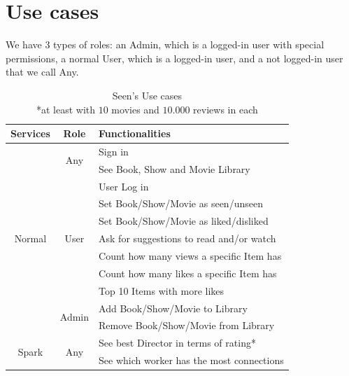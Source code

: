 \documentclass[oneside]{article}
\newcommand*\fpar{\hspace{1ex}}
\begin{document}
\section{Use cases}
\label{sec:cases}
\fpar We have 3 types of roles: an Admin, which is a logged-in user with special permissions, a normal User, which is a logged-in user, and a not logged-in user that we call Any.
\begin{table}[H]
  \centering
  \begin{tabular}{c|c|l} 
    Services & Role & Functionalities \\ \hline
    \multirow{11}{*}{ Normal }
      & \multirow{2}{*}{ Any } 
        & Sign in \\
      & & See Book, Show and Movie Library \\ \cline{2-3}
      & \multirow{7}{*}{ User } 
        & User Log in \\
      & & Set Book/Show/Movie as seen/unseen \\
      & & Set Book/Show/Movie as liked/disliked \\ 
      & & Ask for suggestions to read and/or watch \\ 
      & & Count how many views a specific Item has \\
      & & Count how many likes a specific Item has \\
      & & Top 10 Items with more likes \\ \cline{2-3}
    & \multirow{2}{*}{ Admin } 
        & Add Book/Show/Movie to Library \\
      & & Remove Book/Show/Movie from Library \\ \hline
    \multirow{2}{*}{ Spark }
      & \multirow{2}{*}{ Any }
        & See best Director in terms of rating* \\
      & & See which worker has the most connections \\
  \end{tabular}
  \caption{Seen's Use cases\\
          \**at least with $10$ movies and $10.000$ reviews in each}
\end{table}
\end{document}

